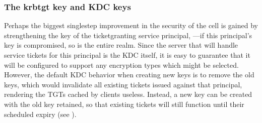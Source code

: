 \documentclass[letterpaper,10pt,english]{sphinxmanual}
\begin{document}
\subsubsection{The krbtgt key and KDC keys}
\label{\detokenize{admin/advanced/retiring-des:the-krbtgt-key-and-kdc-keys}}
\sphinxAtStartPar
Perhaps the biggest single\sphinxhyphen{}step improvement in the security of the cell
is gained by strengthening the key of the ticket\sphinxhyphen{}granting service principal,
—if this principal’s key is compromised, so is the
entire realm.  Since the server that will handle service tickets
for this principal is the KDC itself, it is easy to guarantee that it
will be configured to support any encryption types which might be
selected.  However, the default KDC behavior when creating new keys is to
remove the old keys, which would invalidate all existing tickets issued
against that principal, rendering the TGTs cached by clients useless.
Instead, a new key can be created with the old key retained, so that
existing tickets will still function until their scheduled expiry
(see {\hyperref[\detokenize{admin/database:changing-krbtgt-key}]{}}).

\begin{sphinxVerbatim}[commandchars=\\\{\}]
\PYG{p}{[} \PYG{p}{]}
 
\PYG{p}{[} \PYG{p}{]}
  
     
   
\end{sphinxVerbatim}
\end{document}
